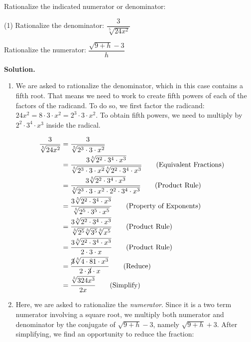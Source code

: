 \begin{ex} \label{rationalizenumdenom} Rationalize the indicated numerator or denominator:

\begin{tasks}(1)
\task  Rationalize the denominator:  $\dfrac{3}{\sqrt[5]{24x^2}}$

\task  Rationalize the numerator: $\dfrac{\sqrt{9 + h} - 3}{h}$

\end{tasks}

{\bf Solution.}

\begin{enumerate}

\item We are asked to rationalize the denominator, which in this case contains a fifth root.  That means we need to work to create fifth powers of each of the factors of the radicand.  To do so, we first factor the radicand:  $24x^2 = 8 \cdot 3 \cdot x^2 = 2^3 \cdot 3 \cdot x^2$.  To obtain fifth powers, we need to multiply by $2^2 \cdot 3^4 \cdot x^3$ inside the radical.

\begin{align*}
\dfrac{3}{\sqrt[5]{24x^2}} & = \dfrac{3}{\sqrt[5]{2^3 \cdot 3 \cdot x^2}} & \\ 
& = \dfrac{3 \sqrt[5]{2^2 \cdot 3^4 \cdot x^3}}{\sqrt[5]{2^3 \cdot 3 \cdot x^2}\sqrt[5]{2^2 \cdot 3^4 \cdot x^3}} \tag{Equivalent Fractions} \\
& = \dfrac{3 \sqrt[5]{2^2 \cdot 3^4 \cdot x^3}}{\sqrt[5]{2^3 \cdot 3 \cdot x^2 \cdot 2^2 \cdot 3^4 \cdot x^3}} \tag{Product Rule} \\
& = \dfrac{3 \sqrt[5]{2^2 \cdot 3^4 \cdot x^3}}{\sqrt[5]{2^5 \cdot 3^5 \cdot x^5}} \tag{Property of Exponents}\\
& = \dfrac{3 \sqrt[5]{2^2 \cdot 3^4 \cdot x^3}}{\sqrt[5]{2^5} \sqrt[5]{3^5}\sqrt[5]{x^5}} \tag{Product Rule}\\
& = \dfrac{3 \sqrt[5]{2^2 \cdot 3^4\cdot x^3}}{2 \cdot 3 \cdot x} \tag{Product Rule}\\
& = \dfrac{\cancel{3} \sqrt[5]{4 \cdot 81\cdot x^3}}{2 \cdot \cancel{3} \cdot x} \tag{Reduce}\\
& = \dfrac{\sqrt[5]{324x^3}}{2x} \tag{Simplify}\\
\end{align*}
													
\item  Here, we are asked to rationalize the \textit{numerator}.  Since it is a two term numerator involving a square root, we multiply both numerator and denominator by the conjugate of $\sqrt{9 + h} - 3$, namely $\sqrt{9 + h} + 3$.  After simplifying, we find an opportunity to reduce the fraction:


\end{enumerate}
\end{ex}
